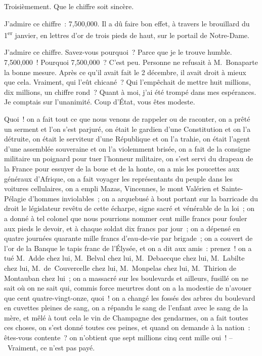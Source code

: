 \documentclass[french,twoside]{book} %
\begin{document}
Troisièmement. Que le chiffre soit sincère.\par
J’admire ce chiffre : 7,500,000. Il a dû faire bon effet, à travers le brouillard du 1\textsuperscript{er} janvier, en lettres d’or de trois pieds de haut, sur le portail de Notre-Dame.\par
J’admire ce chiffre. Savez-vous pourquoi ? Parce que je le trouve humble. 7,500,000 ! Pourquoi 7,500,000 ? C’est peu. Personne ne refusait à M. Bonaparte la bonne mesure. Après ce qu’il avait fait le 2 décembre, il avait droit à mieux que cela. Vraiment, qui l’eût chicané ? Qui l’empêchait de mettre huit millions, dix millions, un chiffre rond ? Quant à moi, j’ai été trompé dans mes espérances. Je comptais sur l’unanimité. Coup d’État, vous êtes modeste.\par
Quoi ! on a fait tout ce que nous venons de rappeler ou de raconter, on a prêté un serment et l’on s’est parjuré, on était le gardien d’une Constitution et on l’a détruite, on était le serviteur d’une République et on l’a trahie, on était l’agent d’une assemblée souveraine et on l’a violemment brisée, on a fait de la consigne militaire un poignard pour tuer l’honneur militaire, on s’est servi du drapeau de la France pour essuyer de la boue et de la honte, on a mis les poucettes aux généraux d’Afrique, on a fait voyager les représentants du peuple dans les voitures cellulaires, on a empli Mazas, Vincennes, le mont Valérien et Sainte-Pélagie d’hommes inviolables ; on a arquebusé à bout portant sur la barricade du droit le législateur revêtu de cette écharpe, signe sacré et vénérable de la loi ; on a donné à tel colonel que nous pourrions nommer cent mille francs pour fouler aux pieds le devoir, et à chaque soldat dix francs par jour ; on a dépensé en quatre journées quarante mille francs d’eau-de-vie par brigade ; on a couvert de l’or de la Banque le tapis franc de l’Élysée, et on a dit aux amis : prenez ! on a tué M. Adde chez lui, M. Belval chez lui, M. Debaecque chez lui, M. Labilte chez lui, M. de Couvercelle chez lui, M. Monpelas chez lui, M. Thirion de Montauban chez lui ; on a massacré sur les boulevards et ailleurs, fusillé on ne sait où on ne sait qui, commis force meurtres dont on a la modestie de n’avouer que cent quatre-vingt-onze, quoi ! on a changé les fossés des arbres du boulevard en cuvettes pleines de sang, on a répandu le sang de l’enfant avec le sang de la mère, et mêlé à tout cela le vin de Champagne des gendarmes, on a fait toutes ces choses, on s’est donné toutes ces peines, et quand on demande à la nation : êtes-vous contente ? on n’obtient que sept millions cinq cent mille oui ! – Vraiment, ce n’est pas payé.\par
\end{document}
